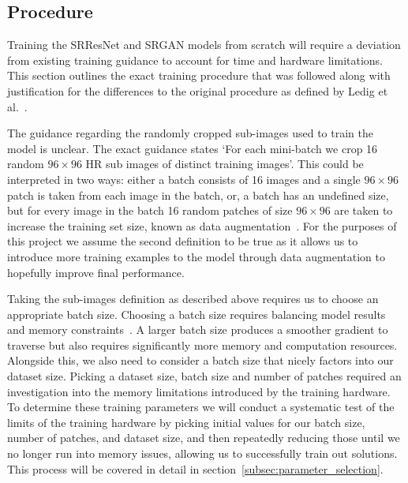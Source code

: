 \subsection{Procedure}\label{subsec:procedure}
Training the SRResNet and SRGAN models from scratch will require a deviation from existing training guidance to account for time and hardware limitations. This section outlines the exact training procedure that was followed along with justification for the differences to the original procedure as defined by Ledig et al.~\cite{srgan}.

The guidance regarding the randomly cropped sub-images used to train the model is unclear. The exact guidance states `For each mini-batch we crop 16 random $96 \times 96$ HR sub images of distinct training images'. This could be interpreted in two ways: either a batch consists of 16 images and a single $96 \times 96$ patch is taken from each image in the batch, or, a batch has an undefined size, but for every image in the batch 16 random patches of size $96 \times 96$ are taken to increase the training set size, known as data augmentation~\cite{dataAugmentation}. For the purposes of this project we assume the second definition to be true as it allows us to introduce more training examples to the model through data augmentation to hopefully improve final performance.

Taking the sub-images definition as described above requires us to choose an appropriate batch size. Choosing a batch size requires balancing model results and memory constraints~\cite{batchSizeTest}. A larger batch size produces a smoother gradient to traverse but also requires significantly more memory and computation resources. Alongside this, we also need to consider a batch size that nicely factors into our dataset size. Picking a dataset size, batch size and number of patches required an investigation into the memory limitations introduced by the training hardware. To determine these training parameters we will conduct a systematic test of the limits of the training hardware by picking initial values for our batch size, number of patches, and dataset size, and then repeatedly reducing those until we no longer run into memory issues, allowing us to successfully train out solutions. This process will be covered in detail in section~\ref{subsec:parameter_selection}.

